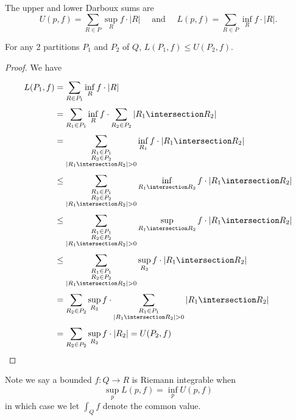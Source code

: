 \begin{definition}
	The upper and lower Darboux sums are
	\[
		U(p,f) = \sum_{R \in P} \sup_R f \cdot |R|
		\quad \text{ and } \quad
		L(p,f) = \sum_{R \in P} \inf_R f \cdot |R|.
	\]
\end{definition}

\begin{lemma}
	For any 2 partitions $P_1$ and $P_2$ of $Q$, $L(P_1,f) \leq U(P_2, f)$.
\end{lemma}

\begin{proof}
	We have
	\begin{align*}
		L(P_1, f) & = \sum_{R \in P_1}^{} \inf_{R} f \cdot |R| \\
							& = \sum_{R_1 \in P_1} \inf_{R} f \cdot \sum_{R_2 \in P_2}^{} |R_1 \intersection R_2 | \\
							& = \sum_{\substack{R_1 \in P_1 \\ R_2 \in P_2 \\ |R_1 \intersection R_2 | > 0} }^{} \inf_{R_1} f \cdot |R_1 \intersection R_2 | \\
							& \leq \sum_{\substack{R_1 \in P_1 \\ R_2 \in P_2 \\ |R_1 \intersection R_2 | > 0} }^{} \inf_{R_1 \intersection R_2} f \cdot |R_1 \intersection R_2 | \\
							& \leq \sum_{\substack{R_1 \in P_1 \\ R_2 \in P_2 \\ |R_1 \intersection R_2 | > 0} }^{} \sup_{R_1 \intersection R_2} f \cdot |R_1 \intersection R_2 | \\
							& \leq \sum_{\substack{R_1 \in P_1 \\ R_2 \in P_2 \\ |R_1 \intersection R_2 | > 0} }^{} \sup_{R_2} f \cdot |R_1 \intersection R_2 | \\
							& = \sum_{R_2 \in P_2}^{} \sup_{R_2} f \cdot \sum_{\substack{R_1 \in P_1 \\ |R_1 \intersection R_2 | > 0}}^{} |R_1 \intersection R_2 | \\
							& = \sum_{R_2 \in P_2}^{} \sup_{R_2} f \cdot |R_2| = U(P_2, f)
	\end{align*}
\end{proof}

\noindent Note we say a bounded $f : Q \to R$ is Riemann integrable when
\[\sup_p L(p,f) = \inf_p U(p,f)\]
in which case we let  $\int_{Q} f$ denote the common value.


